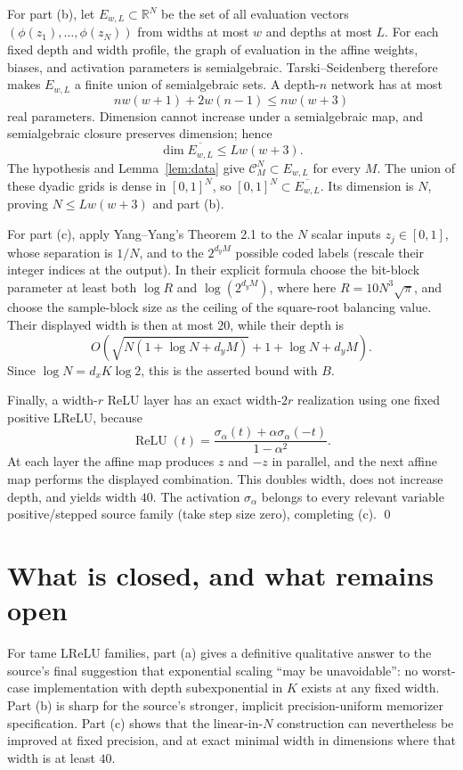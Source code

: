\documentclass[10pt]{article}
\newcommand{\R}{\mathbb R}
\newcommand{\C}{\mathcal C}
\newcommand{\relu}{\operatorname{ReLU}}
\begin{document}
For part (b), let $E_{w,L}\subset\R^N$ be the set of all evaluation vectors
\((\phi(z_1),\ldots,\phi(z_N))\) from widths at most $w$ and depths at
most $L$.  For each fixed depth and width profile, the graph of evaluation
in the affine weights, biases, and activation parameters is semialgebraic.
Tarski--Seidenberg therefore makes $E_{w,L}$ a finite union of
semialgebraic sets.  A depth-$n$ network has at most
\[
 n w(w+1)+2w(n-1)\le n w(w+3)
\]
real parameters.  Dimension cannot increase under a semialgebraic map, and
semialgebraic closure preserves dimension; hence
\[
       \dim\overline{E_{w,L}}\le Lw(w+3).
\]
The hypothesis and Lemma~\ref{lem:data} give
\(\C_M^N\subset E_{w,L}\) for every $M$.  The union of these dyadic grids
is dense in $[0,1]^N$, so
\([0,1]^N\subset\overline{E_{w,L}}\).  Its dimension is $N$, proving
\(N\le Lw(w+3)\) and part (b).

For part (c), apply Yang--Yang's Theorem 2.1 \cite{YY} to the $N$ scalar
inputs $z_j\in[0,1]$, whose separation is $1/N$, and to the
\(2^{d_yM}\) possible coded labels (rescale their integer indices at the
output).  In their explicit formula choose the bit-block parameter at least
both \(\log R\) and \(\log(2^{d_yM})\), where here
\(R=10N^3\sqrt\pi\), and choose the sample-block size as the ceiling of
the square-root balancing value.  Their displayed width is then at most
$20$, while their depth is
\[
       O\!\left(\sqrt{N(1+\log N+d_yM)}+1+\log N+d_yM\right).
\]
Since \(\log N=d_xK\log2\), this is the asserted bound with $B$.

Finally, a width-$r$ ReLU layer has an exact width-$2r$ realization using
one fixed positive LReLU, because
\[
       \relu(t)=\frac{\sigma_\alpha(t)+
       \alpha\sigma_\alpha(-t)}{1-\alpha^2}.
\]
At each layer the affine map produces $z$ and $-z$ in parallel, and the
next affine map performs the displayed combination.  This doubles width,
does not increase depth, and yields width $40$.  The activation
\(\sigma_\alpha\) belongs to every relevant variable positive/stepped
source family (take step size zero), completing (c). \qed

\section*{What is closed, and what remains open}

For tame LReLU families, part (a) gives a definitive qualitative answer to
the source's final suggestion that exponential scaling ``may be
unavoidable'': no worst-case implementation with depth subexponential in
$K$ exists at any fixed width.  Part (b) is sharp for the source's stronger,
implicit precision-uniform memorizer specification.  Part (c) shows that the
linear-in-$N$ construction can nevertheless be improved at fixed precision,
and at exact minimal width in dimensions where that width is at least $40$.
\end{document}
